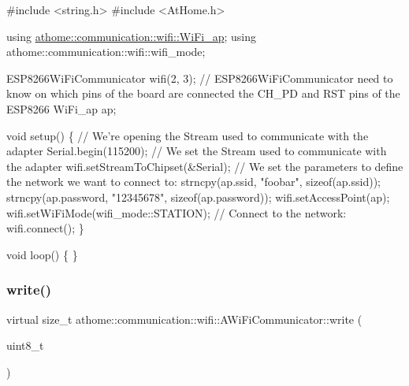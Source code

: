 \begin{DoxyCode}
\textcolor{preprocessor}{#include <string.h>}
\textcolor{preprocessor}{#include <AtHome.h>}

\textcolor{keyword}{using} \mbox{\hyperlink{structathome_1_1communication_1_1wifi_1_1s__wifi__access__point}{athome::communication::wifi::WiFi\_ap}};
\textcolor{keyword}{using} athome::communication::wifi::wifi\_mode;

ESP8266WiFiCommunicator wifi(2, 3); \textcolor{comment}{// ESP8266WiFiCommunicator need to know on which pins of the board are
       connected the CH\_PD and RST pins of the ESP8266}
WiFi\_ap ap;

\textcolor{keywordtype}{void} setup() \{
  \textcolor{comment}{// We're opening the Stream used to communicate with the adapter}
  Serial.begin(115200);
  \textcolor{comment}{// We set the Stream used to communicate with the adapter}
  wifi.setStreamToChipset(&Serial);
  \textcolor{comment}{// We set the parameters to define the network we want to connect to:}
  strncpy(ap.ssid, \textcolor{stringliteral}{"foobar"}, \textcolor{keyword}{sizeof}(ap.ssid));
  strncpy(ap.password, \textcolor{stringliteral}{"12345678"}, \textcolor{keyword}{sizeof}(ap.password));
  wifi.setAccessPoint(ap);
  wifi.setWiFiMode(wifi\_mode::STATION);
  \textcolor{comment}{// Connect to the network:}
  wifi.connect();
\}

\textcolor{keywordtype}{void} loop() \{
\}
\end{DoxyCode}
 \mbox{\label{classathome_1_1communication_1_1wifi_1_1_a_wi_fi_communicator_a7544a06e5b6d65108cb2c0c5702c5f29}} 
\subsubsection{\texorpdfstring{write()}{write()}}
{\footnotesize\ttfamily virtual size\+\_\+t athome\+::communication\+::wifi\+::\+A\+Wi\+Fi\+Communicator\+::write (\begin{DoxyParamCaption}\item[{uint8\+\_\+t}]{ }\end{DoxyParamCaption})\hspace{0.3cm}{\ttfamily [pure virtual]}}

